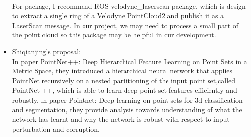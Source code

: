 \documentclass{article}
\begin{document}
\begin{normalsize}
\begin{itemize}
\\
For package, I recommend ROS velodyne\_laserscan package, which is design to extract a single ring of a Velodyne PointCloud2 and publish it as a LaserScan message. In our project, we may need to process a small part of the point cloud so this package may be helpful in our development.
\item Shiqianjing's proposal:\\
In paper PointNet++: Deep Hierarchical Feature Learning on Point Sets in a Metric Space, they introduced a hierarchical neural network that applies PointNet recursively on a nested partitioning of the input point set,called PointNet ++, which is able to learn deep point set features efficiently and robustly. In paper  Pointnet: Deep learning on point sets for 3d classification and segmentation, they provide analysis towards understanding of what the network has learnt and why the network is robust with respect to input perturbation and corruption.\\


\end{itemize}
\end{normalsize}
\end{document}
